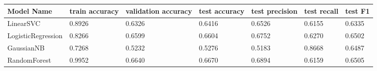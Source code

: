 \documentclass{article}%
\begin{document}
%
\normalsize%
\begin{longtable}{l l l l l l l}%
\hline%
Model Name&train accuracy&validation accuracy&test accuracy&test precision&test recall&test F1\\%
\hline%
\endhead%
\hline%
LinearSVC&0.8926&0.6326&0.6416&0.6526&0.6155&0.6335\\%
LogisticRegression&0.8266&0.6599&0.6604&0.6752&0.6270&0.6502\\%
GaussianNB&0.7268&0.5232&0.5276&0.5183&0.8668&0.6487\\%
RandomForest&0.9952&0.6640&0.6670&0.6894&0.6159&0.6505\\%
\end{longtable}%
\end{document}

